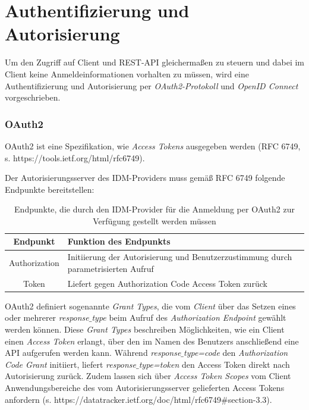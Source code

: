 \chapter{Authentifizierung und Autorisierung}
Um den Zugriff auf Client und REST-API gleichermaßen zu steuern und dabei im Client keine Anmeldeinformationen vorhalten zu müssen, wird eine Authentifizierung und Autorisierung per \textit{OAuth2-Protokoll} und \textit{OpenID Connect} vorgeschrieben.

\subsection{OAuth2}
\label{auth:oauth2}

OAuth2 ist eine Spezifikation, wie \textit{Access Tokens} ausgegeben werden (RFC 6749, s. https://tools.ietf.org/html/rfc6749). 

Der Autorisierungsserver des IDM-Providers muss gemäß RFC 6749 folgende Endpunkte bereitstellen:

\begin{table}[htb]
    \begin{tabularx}{\textwidth}{|c|X|}
        \hline
\textbf{Endpunkt} & \textbf{Funktion des Endpunkts} \\ \hline
Authorization & Initiierung der Autorisierung und Benutzerzustimmung durch parametrisierten Aufruf \\ \hline
Token & Liefert gegen Authorization Code Access Token zurück \\ \hline
    \end{tabularx}

        \caption{Endpunkte, die durch den IDM-Provider für die Anmeldung per OAuth2 zur Verfügung gestellt werden müssen}
        \label{tab:auth:endpoints}
\end{table}

OAuth2 definiert sogenannte \textit{Grant Types}, die vom \textit{Client} über das Setzen eines oder mehrerer \textit{response$\_$type} beim Aufruf des \textit{Authorization Endpoint} gewählt werden können. 
Diese \textit{Grant Types} beschreiben Möglichkeiten, wie ein Client einen \textit{Access Token} erlangt, über den im Namen des Benutzers anschließend eine API aufgerufen werden kann. 
Während \textit{response$\_$type=code} den \textit{Authorization Code Grant} initiiert, liefert \textit{response$\_$type=token} den Access Token direkt nach Autorisierung zurück. 
Zudem lassen sich über \textit{Access Token Scopes} vom Client Anwendungsbereiche des vom Autorisierungsserver gelieferten Access Tokens anfordern (s. https://datatracker.ietf.org/doc/html/rfc6749\#section-3.3).

